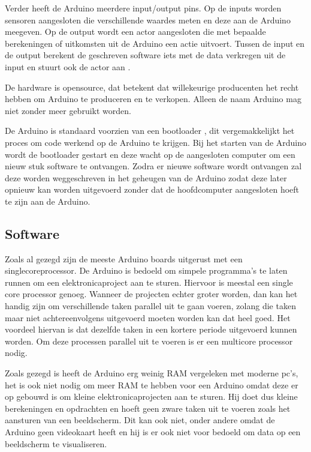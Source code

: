 \documentclass[a4paper, dutch, abstract=true]{scrartcl}
\begin{document}
Verder heeft de Arduino meerdere input/output pins.
Op de inputs worden sensoren aangesloten die verschillende waardes meten en deze aan de Arduino
meegeven.
Op de output wordt een actor aangesloten die met bepaalde berekeningen of uitkomsten uit de Arduino
een actie uitvoert.
Tussen de input en de output berekent de geschreven software iets met de data verkregen uit de input
en stuurt ook de actor aan \cite{arduinoreference}.

De hardware is opensource, dat betekent dat willekeurige producenten het recht hebben om Arduino te
produceren en te verkopen.
Alleen de naam Arduino mag niet zonder meer gebruikt worden.

De Arduino is standaard voorzien van een bootloader \cite{optiboot2019github}, dit vergemakkelijkt
het proces om code werkend op de Arduino te krijgen.
Bij het starten van de Arduino wordt de bootloader gestart en deze wacht op de aangesloten computer
om een nieuw stuk software te ontvangen.
Zodra er nieuwe software wordt ontvangen zal deze worden weggeschreven in het geheugen van de
Arduino zodat deze later opnieuw kan worden uitgevoerd zonder dat de hoofdcomputer aangesloten hoeft
te zijn aan de Arduino.

\subsection{Software}
Zoals al gezegd zijn de meeste Arduino boards uitgerust met een singlecoreprocessor.
De Arduino is bedoeld om simpele programma's te laten runnen om een elektronicaproject aan te
sturen.
Hiervoor is meestal een single core processor genoeg.
Wanneer de projecten echter groter worden, dan kan het handig zijn om verschillende taken parallel
uit te gaan voeren, zolang die taken maar niet achtereenvolgens uitgevoerd moeten worden kan dat
heel goed.
Het voordeel hiervan is dat dezelfde taken in een kortere periode uitgevoerd kunnen worden.
Om deze processen parallel uit te voeren is er een multicore processor nodig.

Zoals gezegd is heeft de Arduino erg weinig RAM vergeleken met moderne pc's, het is ook niet nodig
om meer RAM te hebben voor een Arduino omdat deze er op gebouwd is om kleine elektronicaprojecten
aan te sturen.
Hij doet dus kleine berekeningen en opdrachten en hoeft geen zware taken uit te voeren zoals het
aansturen van een beeldscherm.
Dit kan ook niet, onder andere omdat de Arduino geen videokaart heeft en hij is er ook niet voor
bedoeld om data op een beeldscherm te visualiseren.
\end{document}
